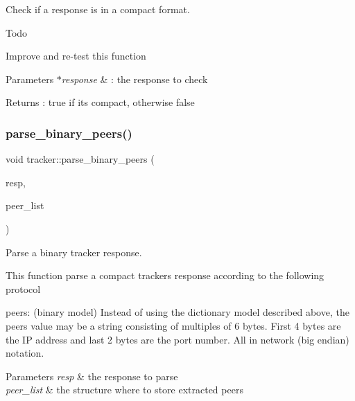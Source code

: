 Check if a response is in a compact format. 

\begin{DoxyRefDesc}{Todo}
\item[\hyperlink{todo__todo000005}{Todo}]Improve and re-\/test this function\end{DoxyRefDesc}



\begin{DoxyParams}{Parameters}
{\em $\ast$response} & \+: the response to check \\
\hline
\end{DoxyParams}
\begin{DoxyReturn}{Returns}
\+: true if it\textquotesingle{}s compact, otherwise false 
\end{DoxyReturn}
\mbox{\label{namespacetracker_a237de4c8b0282af2d59cd5d0b7bfd1fd}} 
\subsubsection{\texorpdfstring{parse\+\_\+binary\+\_\+peers()}{parse\_binary\_peers()}}
{\footnotesize\ttfamily void tracker\+::parse\+\_\+binary\+\_\+peers (\begin{DoxyParamCaption}\item[{const string \&}]{resp,  }\item[{\hyperlink{namespacepwp_ad07fa6df116b205302ad5ec172277184}{pwp\+::\+Peer\+List}}]{peer\+\_\+list }\end{DoxyParamCaption})}



Parse a binary tracker response. 

This function parse a compact tracker\textquotesingle{}s response according to the following protocol

peers\+: (binary model) Instead of using the dictionary model described above, the peers value may be a string consisting of multiples of 6 bytes. First 4 bytes are the IP address and last 2 bytes are the port number. All in network (big endian) notation.


\begin{DoxyParams}{Parameters}
{\em resp} & the response to parse \\
\hline
{\em peer\+\_\+list} & the structure where to store extracted peers \\
\hline
\end{DoxyParams}
\mbox{\label{namespacetracker_a38d52cf6dd86f2a26a719e285097c805}} 
